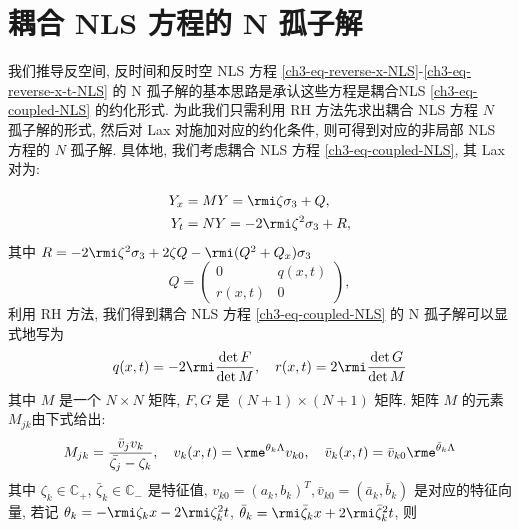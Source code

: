 \section{耦合 NLS 方程的 N 孤子解}

我们推导反空间, 反时间和反时空 NLS 方程 \eqref{ch3-eq-reverse-x-NLS}-\eqref{ch3-eq-reverse-x-t-NLS} 的 N 孤子解的基本思路是承认这些方程是耦合NLS \eqref{ch3-eq-coupled-NLS} 的约化形式. 为此我们只需利用 RH 方法先求出耦合 NLS 方程 $N$ 孤子解的形式, 然后对 Lax 对施加对应的约化条件, 则可得到对应的非局部 NLS 方程的 $N$ 孤子解. 具体地, 我们考虑耦合 NLS 方程 \eqref{ch3-eq-coupled-NLS}, 其 Lax 对为:

\begin{align}
    Y_{x} & = MY = \rmi \zeta \sigma_{3} + Q,        \\
    Y_{t} & = NY = -2 \rmi \zeta^{2} \sigma_{3} + R,
\end{align}
其中 $R= -2 \rmi \zeta^{2} \sigma_{3} + 2\zeta Q - \rmi(Q^{2}+Q_{x})\sigma_{3}$
\begin{equation}
    Q = \begin{pmatrix}
        0      & q(x,t) \\
        r(x,t) & 0
    \end{pmatrix},
\end{equation}
利用 RH 方法, 我们得到耦合 NLS 方程 \eqref{ch3-eq-coupled-NLS} 的 N 孤子解可以显式地写为
\begin{equation}
    q(x,t) = -2 \rmi \frac{\det F}{\det M}, \quad r(x,t) = 2 \rmi \frac{\det G}{\det M} \label{ch3-eq-soliton-coupled-NLS}
\end{equation}
其中 $M$ 是一个 $ N \times N $ 矩阵, $F, G$ 是 $ (N+1) \times (N+1) $ 矩阵. 矩阵 $M$ 的元素 $M_{jk}$由下式给出:
\begin{equation}
    M_{jk} = \frac{\bar{v}_{j}v_{k}}{\bar{\zeta_{j}}-\zeta_{k}}, \quad v_{k}(x,t)= \rme^{\theta_{k}\Lambda} v_{k0}, \quad \bar{v}_{k}(x,t) = \bar{v}_{k0}\rme^{\bar{\theta}_{k}\Lambda}
\end{equation}
其中 $\zeta_{k} \in \mathbb{C}_{+}$, $\bar{\zeta}_{k} \in \mathbb{C}_{-}$ 是特征值, $v_{k0} = (a_{k}, b_{k})^{T}, \bar{v}_{k0} = (\bar{a}_{k}, \bar{b}_{k})$ 是对应的特征向量, 若记 $ \theta_{k} = -\rmi \zeta_{k} x - 2 \rmi \zeta_{k}^{2}t$, $\bar{\theta}_{k} = \rmi \bar{\zeta}_{k} x + 2 \rmi \bar{\zeta}_{k}^{2}t $, 则

